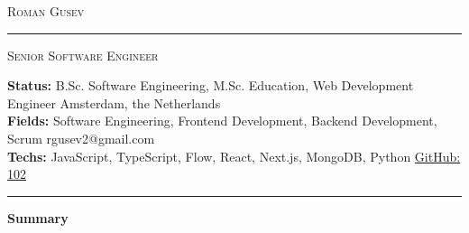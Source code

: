 \documentclass[10pt,A4]{article}
\newcommand{\cvsection}[1]
{
	\begin{center}
		\large\textcolor{sectcol}{\textbf{#1}}
	\end{center}
}
\newcommand{\metasection}[2]
{
    \footnotesize{#2} \hspace*{\fill} \footnotesize{#1}\\[1pt]
}
\begin{document}
\pagestyle{fancy}	








\vspace{-8pt}
\begin{center}
	\huge \textsc{Roman Gusev} \textcolor{sectcol}{\rule[-1mm]{1mm}{0.75cm}} \textsc{Senior Software Engineer}\\[2pt]
\end{center}

\vspace{6pt}

\metasection{Amsterdam, the Netherlands}{\textbf{Status:} B.Sc. Software Engineering, M.Sc. Education, Web Development Engineer}
\metasection{rgusev2@gmail.com}{\textbf{Fields:} Software Engineering, Frontend Development, Backend Development, Scrum} 
\metasection{\href{https://github.com/102}{GitHub: 102}}{\textbf{Techs:} JavaScript, TypeScript, Flow, React, Next.js, MongoDB, Python}
\vspace{-2pt}
\textcolor{softcol}{\hrule}
\vspace{6pt}

\normalsize

\vspace{-6pt}
\cvsection{Summary}
\vspace{-6pt}
\end{document}
